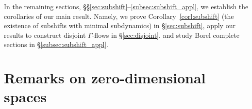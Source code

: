 \documentclass[11pt,reqno,psamsfonts]{amsart}
\theoremstyle{bfnote}
\theoremstyle{definition}
\theoremstyle{remark}
\newcommand{\0}{\varnothing}
\newcommand{\set}[1]{\{#1\}}
\newcommand{\red}[1]{{\color{red}#1}}
\newcommand{\todo}[1]{\red{\textbf{\upshape{[#1]}}}}
\newcommand{\emphd}[1]{{\fontseries{b}\selectfont\textsf{#1}}}
\newcommand{\acts}{\mathrel{\reflectbox{$\righttoleftarrow$}}}
\newcommand{\G}{\Gamma}
\newcommand{\Free}{\mathsf{Free}}
\newcommand{\N}{\mathbb{N}}
\newcommand{\sr}{amply syndetic\xspace}
\numberwithin{equation}{section}
\begin{document}
    In the remaining sections, \S\S\ref{sec:subshift}--\ref{subsec:subshift_appl}, we establish the corollaries of our main result. Namely, we prove Corollary~\ref{corl:subshift} (the existence of subshifts with minimal subdynamics) in \S\ref{sec:subshift}, apply our results to construct disjoint $\G$-flows in \S\ref{sec:disjoint}, and study Borel complete sections in \S\ref{subsec:subshift_appl}. %

    \section{Remarks on zero-dimensional spaces}\label{sec:prelims}





\end{document}
